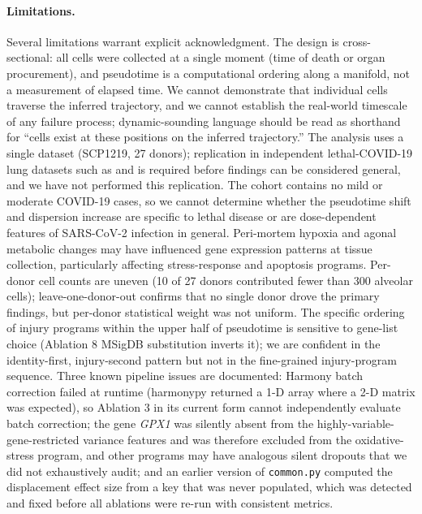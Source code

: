 \documentclass[11pt]{article}
\begin{document}
\paragraph{Limitations.} Several limitations warrant explicit acknowledgment. The design is cross-sectional: all cells were collected at a single moment (time of death or organ procurement), and pseudotime is a computational ordering along a manifold, not a measurement of elapsed time. We cannot demonstrate that individual cells traverse the inferred trajectory, and we cannot establish the real-world timescale of any failure process; dynamic-sounding language should be read as shorthand for ``cells exist at these positions on the inferred trajectory.'' The analysis uses a single dataset (SCP1219, 27 donors); replication in independent lethal-COVID-19 lung datasets such as \citet{Delorey2021} and \citet{Wendisch2021} is required before findings can be considered general, and we have not performed this replication. The cohort contains no mild or moderate COVID-19 cases, so we cannot determine whether the pseudotime shift and dispersion increase are specific to lethal disease or are dose-dependent features of SARS-CoV-2 infection in general. Peri-mortem hypoxia and agonal metabolic changes may have influenced gene expression patterns at tissue collection, particularly affecting stress-response and apoptosis programs. Per-donor cell counts are uneven (10 of 27 donors contributed fewer than 300 alveolar cells); leave-one-donor-out confirms that no single donor drove the primary findings, but per-donor statistical weight was not uniform. The specific ordering of injury programs within the upper half of pseudotime is sensitive to gene-list choice (Ablation 8 MSigDB substitution inverts it); we are confident in the identity-first, injury-second pattern but not in the fine-grained injury-program sequence. Three known pipeline issues are documented: Harmony batch correction failed at runtime (harmonypy returned a 1-D array where a 2-D matrix was expected), so Ablation 3 in its current form cannot independently evaluate batch correction; the gene \textit{GPX1} was silently absent from the highly-variable-gene-restricted variance features and was therefore excluded from the oxidative-stress program, and other programs may have analogous silent dropouts that we did not exhaustively audit; and an earlier version of \texttt{common.py} computed the displacement effect size from a key that was never populated, which was detected and fixed before all ablations were re-run with consistent metrics.
\end{document}
